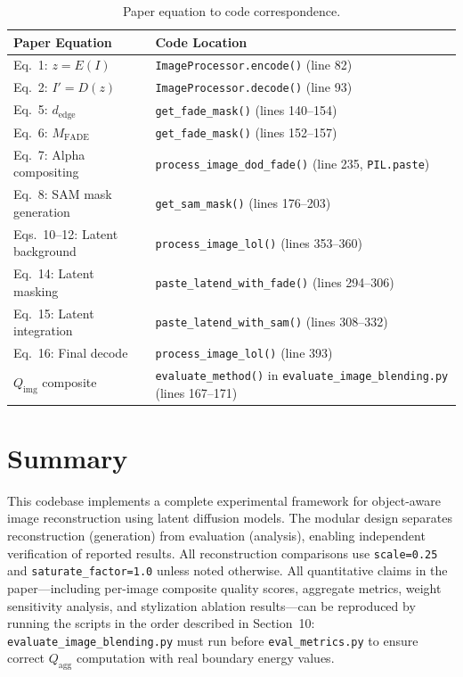 \documentclass[11pt,a4paper]{article}
\begin{document}
\begin{table}[h]
\centering
\small
\caption{Paper equation to code correspondence.}
\label{tab:correspondence}
\begin{tabularx}{\textwidth}{lX}
\toprule
\textbf{Paper Equation} & \textbf{Code Location} \\
\midrule
Eq.~1: $z = E(I)$ & \texttt{ImageProcessor.encode()} (line 82) \\
Eq.~2: $I' = D(z)$ & \texttt{ImageProcessor.decode()} (line 93) \\
Eq.~5: $d_{\text{edge}}$ & \texttt{get\_fade\_mask()} (lines 140--154) \\
Eq.~6: $M_{\text{FADE}}$ & \texttt{get\_fade\_mask()} (lines 152--157) \\
Eq.~7: Alpha compositing & \texttt{process\_image\_dod\_fade()} (line 235, \texttt{PIL.paste}) \\
Eq.~8: SAM mask generation & \texttt{get\_sam\_mask()} (lines 176--203) \\
Eqs.~10--12: Latent background & \texttt{process\_image\_lol()} (lines 353--360) \\
Eq.~14: Latent masking & \texttt{paste\_latend\_with\_fade()} (lines 294--306) \\
Eq.~15: Latent integration & \texttt{paste\_latend\_with\_sam()} (lines 308--332) \\
Eq.~16: Final decode & \texttt{process\_image\_lol()} (line 393) \\
$Q_{\text{img}}$ composite & \texttt{evaluate\_method()} in \texttt{evaluate\_image\_blending.py} (lines 167--171) \\
\bottomrule
\end{tabularx}
\end{table}

\section{Summary}

This codebase implements a complete experimental framework for object-aware image reconstruction using latent diffusion models. The modular design separates reconstruction (generation) from evaluation (analysis), enabling independent verification of reported results. All reconstruction comparisons use \texttt{scale=0.25} and \texttt{saturate\_factor=1.0} unless noted otherwise. All quantitative claims in the paper---including per-image composite quality scores, aggregate metrics, weight sensitivity analysis, and stylization ablation results---can be reproduced by running the scripts in the order described in Section~10: \texttt{evaluate\_image\_blending.py} must run before \texttt{eval\_metrics.py} to ensure correct $Q_{\text{agg}}$ computation with real boundary energy values.
\end{document}
